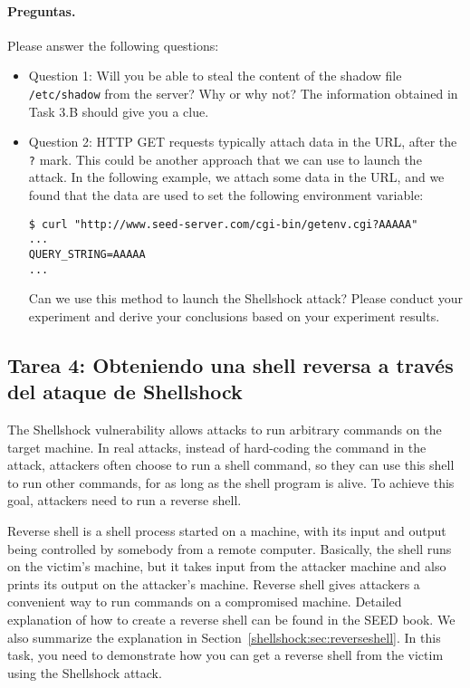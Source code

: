 \paragraph{Preguntas.} Please answer the following questions:
\begin{itemize}
\item Question 1: Will you be able to steal the content of 
the shadow file \texttt{/etc/shadow} from the server? Why or why not?  
The information obtained in Task 3.B should give you a clue. 

\item Question 2: HTTP GET requests typically attach data in the URL, 
after the \texttt{?} mark. This could be another 
approach that we can use to launch the attack. In the following example,
we attach some data in the URL, and we found that the data are used to set
the following environment variable: 

\begin{lstlisting}
$ curl "http://www.seed-server.com/cgi-bin/getenv.cgi?AAAAA"
...
QUERY_STRING=AAAAA
...
\end{lstlisting}

Can we use this method to launch the Shellshock attack? Please conduct your 
experiment and derive your conclusions based on your experiment results. 
     
\end{itemize}

  


\subsection{Tarea 4: Obteniendo una shell reversa a través del ataque de Shellshock }

The Shellshock vulnerability allows attacks to run arbitrary commands on
the target machine. In real attacks, instead of hard-coding the command 
in the attack, attackers often choose to run a shell
command, so they can use this shell to run other commands,
for as long as the shell program is alive. 
To achieve this goal, attackers need to run a reverse shell.

Reverse shell is a shell process started on a machine, with its input and output being
controlled by somebody from a remote computer. Basically, the shell runs
on the victim's machine, but it takes input from the attacker machine and
also prints its output on the attacker's machine. Reverse shell
gives attackers a convenient way to run commands on a compromised machine. 
Detailed explanation of how to create a reverse shell can be found in 
the SEED book. We also summarize the explanation in
Section~\ref{shellshock:sec:reverseshell}.
In this task, you need to demonstrate 
how you can get a reverse shell from the victim using the Shellshock attack. 


